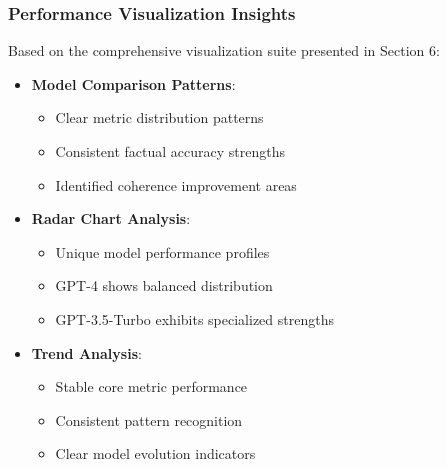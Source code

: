 \subsubsection{Performance Visualization Insights}
Based on the comprehensive visualization suite presented in Section 6:
\begin{itemize}
    \item \textbf{Model Comparison Patterns}:
    \begin{itemize}
        \item Clear metric distribution patterns
        \item Consistent factual accuracy strengths
        \item Identified coherence improvement areas
    \end{itemize}
    \item \textbf{Radar Chart Analysis}:
    \begin{itemize}
        \item Unique model performance profiles
        \item GPT-4 shows balanced distribution
        \item GPT-3.5-Turbo exhibits specialized strengths
    \end{itemize}
    \item \textbf{Trend Analysis}:
    \begin{itemize}
        \item Stable core metric performance
        \item Consistent pattern recognition
        \item Clear model evolution indicators
    \end{itemize}
\end{itemize}


